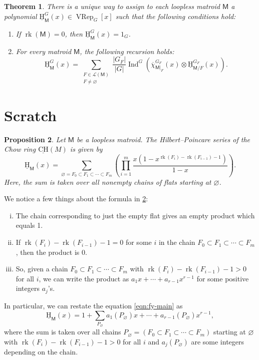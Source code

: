 \documentclass[11pt, a4paper, english]{amsart}
\theoremstyle{teoremas}
\newtheorem{theorem}{Theorem}[section]
\newtheorem{proposition}[theorem]{Proposition}
\theoremstyle{definition}
\DeclareMathOperator{\rk}{rk}
\newcommand{\M}{\mathsf{M}}
\newcommand{\uH}{\underline{\mathrm{H}}}
\newcommand{\uCH}{\underline{\mathrm{CH}}}
\newcommand{\VRep}{\operatorname{VRep}}
\newcommand{\Ind}{\operatorname{Ind}}
\begin{document}
\begin{theorem}\label{thm:equiv-main}
    There is a unique way to assign to each loopless matroid $\M$  a polynomial $\uH_{\M}^G(x)\in \VRep_G[x]$ such that the following conditions hold:
    \begin{enumerate}[\normalfont(i)]
        \item If $\rk(\M) = 0$, then $\uH_{\M}^G(x) = 1_G$.
        \item For every matroid $\M$, the following recursion holds:
            \[ \uH_{\M}^G(x) = \sum_{\substack{F\in\mathcal{L}(\M)\\ F\neq\varnothing}} \frac{|G_F|}{|G|}\Ind^G\left(\overline{\chi}_{\M|_F}^{G_F}(x)\otimes \uH_{\M/F}^{G_F}(x)\right).\]
    \end{enumerate}
\end{theorem}

\section{Scratch}

\begin{proposition}\label{prop:fy-main}
    Let $\M$ be a loopless matroid. The Hilbert--Poincare series of the Chow ring $\uCH(M)$ is given by
    \begin{equation}\label{eqn:fy-main}
        \uH_{\M}(x) = \sum_{\varnothing = F_0\subset F_1\subset\cdots\subset F_m}
        \left(\prod_{i=1}^{m}{\frac{x(1-x^{\rk(F_i)-\rk(F_{i-1})-1})}{1-x}}\right).
    \end{equation}
    Here, the sum is taken over all nonempty chains of flats starting at $\varnothing$.
\end{proposition}
We notice a few things about the formula in \ref*{prop:fy-main}:
\begin{enumerate}[(i)]
    \item The chain corresponding to just the empty flat gives an empty product which equals 1.
    \item If $\rk(F_i)-\rk(F_{i-1})-1 = 0$ for some $i$ in the chain $F_0\subset F_1\subset\cdots\subset F_m$, then the product is 0.
    \item So, given a chain $F_0\subset F_1\subset\cdots\subset F_m$ with $\rk(F_i)-\rk(F_{i-1})-1 > 0$ for all $i$, we can write the product as
        $a_1x+\cdots+a_{r-1}x^{r-1}$ for some positive integers $a_j$'s.
\end{enumerate}

In particular, we can restate the equation \ref*{eqn:fy-main} as
    $$\uH_{\M}(x) = 1 + \sum_{P_\varnothing}
    {a_1(P_\varnothing)x+\cdots+a_{r-1}(P_\varnothing)x^{r-1}},$$
where the sum is taken over all chains $P_\varnothing = (F_0\subset F_1\subset\cdots\subset F_m)$ starting at $\varnothing$ with $\rk(F_i)-\rk(F_{i-1})-1 > 0$ for all $i$ and
$a_j(P_\varnothing)$ are some integers depending on the chain.
\end{document}
